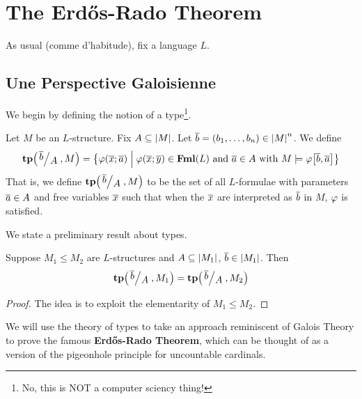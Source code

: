 \section{The Erd\H{o}s-Rado Theorem}

As usual (comme d'habitude), fix a language $L$.

\subsection{Une Perspective Galoisienne}

We begin by defining the notion of a type\footnote{No, this is NOT a computer sciency thing!}.
\begin{boxdefinition}[Type]
    Let $M$ be an $L$-structure. Fix $A \subseteq \left\lvert M \right\rvert$.
    Let $\overline{b} = \left( b_1, \ldots, b_n \right) \in \left\lvert M \right\rvert^n$. We define
    \begin{align*}
        \tp\of{\quotient{\ol{b}}{A}, M}
        =
        \setst{\varphi\of{\ol{x}; \ol{a}}}{\vp\of{\ol{x}; \ol{y}} \in \Fml(L) \text{ and } \ol{a} \in A \text{ with } M \models \vp\!\brac{\ol{b}, \ol{a}}}
    \end{align*}
    That is, we define $\tp\of{\quotient{\ol{b}}{A}, M}$ to be the set of all $L$-formulae with parameters $\overline{a} \in A$ and free variables $\overline{x}$ such that when the $\overline{x}$ are interpreted as $\overline{b}$ in $M$, $\varphi$ is satisfied.
\end{boxdefinition}

We state a preliminary result about types.

\begin{boxlemma}
   Suppose $M_1 \leq M_2$ are $L$-structures and $A \subseteq \left\lvert M_1 \right\rvert$, $\overline{b} \in \left\lvert M_1 \right\rvert$. Then
   \begin{align*}
       \tp\of{\quotient{\ol{b}}{A}, M_1} = 
       \tp\of{\quotient{\ol{b}}{A}, M_2}
   \end{align*}
\end{boxlemma}
\begin{proof}
    The idea is to exploit the elementarity of $M_1 \leq M_2$. \sorry
\end{proof}

We will use the theory of types to take an approach reminiscent of Galois Theory to prove the famous \textbf{Erd\H{o}s-Rado Theorem}, which can be thought of as a version of the pigeonhole principle for uncountable cardinals.
